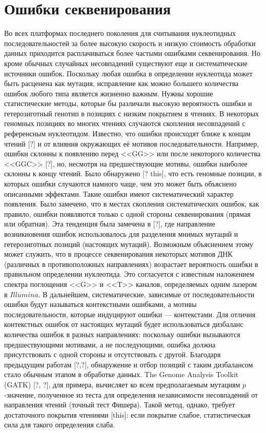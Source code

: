 \section{Ошибки секвенирования}
	Во всех платформах последнего поколения для считывания нуклеотидных последовательностей за более высокую скорость и низкую стоимость обработки данных приходится расплачиваться более частыми ошибками секвенирования. Но кроме обычных случайных несовпадений существуют еще и систематические источники ошибок. Поскольку любая ошибка в определении нуклеотида может быть расценена как мутация, исправление как можно большего количества ошибок любого типа является жизненно важным. Нужны хорошие статистические методы, которые бы различали высокую вероятность ошибки и гетерозиготный генотип в позициях с низким покрытием в чтениях. 
	В некоторых геномных позициях  во многих чтениях случаются скопления несовпадений с референсным нуклеотидом. Известно, что ошибки происходят ближе к концам чтений [?] и от влияния окружающих её мотивов последовательности. Например, ошибки склонны к появлению перед <<GG>> или после некоторого количества <<GGC>> [?], но, несмотря на предшествующие мотивы, ошибки наиболее склонны к концу чтений. Было обнаружено [? this], что есть геномные позиции, в которых ошибки случаются намного чаще, чем это может быть объяснено описанными эффектами. Такие ошибки имеют систематический характер появления. Было замечено, что в местах скопления систематических ошибок, как правило, ошибки появляются только с одной стороны секвенирования (прямая или обратная). Эта тенденция была замечена в [?], где направление возникновения ошибок использовалось для разделения мнимых мутаций и гетерозиготных позиций (настоящих мутаций). Возможным объяснением этому может служить, что в процессе секвенирования некоторых мотивов ДНК (различных в противоположных направлениях) возрастает вероятность ошибки в правильном определении нуклеотида. Это согласуется с известным наложением спектра поглощения <<G>> и <<T>> каналов, определяемых одним лазером в $Illumina$.
	В дальнейшем, систематические, зависимые от последовательности ошибки будут называться контекстными ошибками, а мотивы последовательности, которые индуцируют ошибки --- контекстами. Для отличия контекстных ошибок от настоящих мутаций будет использоваться дизбаланс количества ошибок в разных направлениях: поскольку ошибки  вызываются предшествующими мотивами, а не последующими, ошибка должна присутствовать с одной стороны и отсутствовать с другой.
	Благодаря предыдущим работам [?,?], обнаружение и отбор позиций с таким дизбалансом стало обычным этапом в обработке данных. The Genome Analysis Toolkit (GATK) [?, ?], для примера, вычисляет ко всем предполагаемым мутациям $p$-значение, полученное из теста для определения независимости несовпадений от направления чтений (точный тест Фишера). Такой метод, однако, требует достаточного покрытия чтениями [this]: если покрытие слабое, статистическая сила для такого определения слаба.

